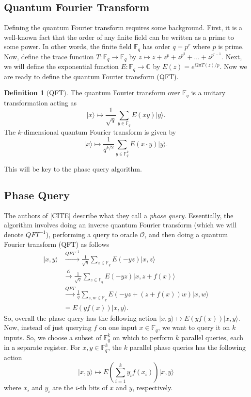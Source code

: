 \documentclass[12pt,twoside]{reedthesis}
\theoremstyle{definition}
\newtheorem{definition}[theorem]{Definition}
\newlength{\arrow}
\newcommand{\C}{\mathbb{C}}
\newcommand{\F}{\mathbb{F}}
\newcommand{\ket}[1]{\ensuremath{\lvert #1\rangle}\xspace}
\begin{document}
\subsection{Quantum Fourier Transform}
Defining the quantum Fourier transform requires some background. First, it is a well-known fact that the order of any finite field can be written as a prime to some power. In other words, the finite field $\F_q$ has order $q = p^r$ where $p$ is prime. Now, define the trace function $T: \F_q \rightarrow \F_q$ by $z \mapsto z + z^p + z^{p^2} + \ldots + z^{p^{r-1}}$. Next, we will define the exponential function $E: \F_q \rightarrow \C$ by $E(z) = e^{i2\pi T(z)/p}$. Now we are ready to define the quantum Fourier transform (QFT).

\begin{definition}[QFT] The quantum Fourier transform over $\F_q$ is a unitary transformation acting as 
\begin{equation*}
\ket{x} \longmapsto \frac{1}{\sqrt{q}} \sum_{y \in \F_q} E(xy) \ket{y}.
\end{equation*}
The $k$-dimensional quantum Fourier transform is given by
\begin{equation*}
\ket{x} \longmapsto \frac{1}{q^{k/2}} \sum_{y\in \F_q^k} E(x \cdot y) \ket{y}.
\end{equation*}
\end{definition}
This will be key to the phase query algorithm.
\subsection{Phase Query}
The authors of [CITE] describe what they call a \textit{phase query}. Essentially, the algorithm involves doing an inverse quantum Fourier transform (which we will denote $QFT^{-1}$), performing a query to oracle $\mathcal{O}$, and then doing a quantum Fourier transform (QFT) as follows
\begin{align}
\ket{x,y} 
& \xrightarrow{QFT^{-1}} \frac{1}{\sqrt{q}} \sum_{z\in \F_q} E(-yz) \ket{x,z} \\
& \xrightarrow{\mathcal{O}} \frac{1}{\sqrt{q}} \sum_{z \in \F_q} E(-yz) \ket{x, z + f(x)} \\
& \xrightarrow{QFT} \frac{1}{q} \sum_{z,w \in \F_q} E(-yz + (z + f(x))w) \ket{x,w} \\
& = E(yf(x)) \ket{x,y}.
\end{align}
So, overall the phase query has the following action $\ket{x,y} \mapsto E(yf(x)) \ket{x,y}$. Now, instead of just querying $f$ on one input $x \in \F_q$, we want to query it on $k$ inputs. So, we choose a subset of $\F_q^k$ on which to perform $k$ parallel queries, each in a separate register. For $x,y \in \F_q^k$, the $k$ parallel phase queries has the following action
\begin{equation*}
\ket{x,y} \longmapsto E\left(\sum_{i=1}^{k} y_i f(x_i) \right) \ket{x,y}
\end{equation*}
where $x_i$ and $y_i$ are the $i$-th bits of $x$ and $y$, respectively.
\end{document}
